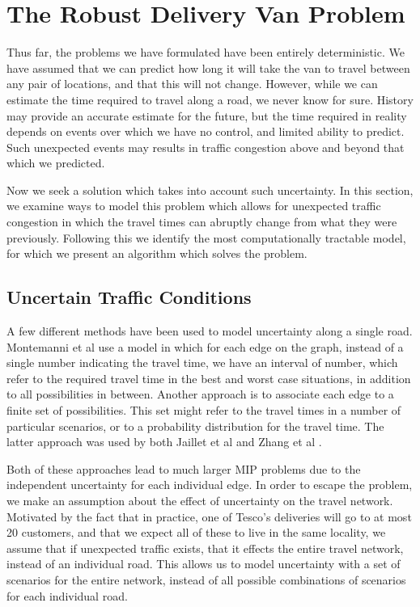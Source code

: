 \section{The Robust Delivery Van Problem}
\label{sec:robust}
Thus far, the problems we have formulated have been entirely deterministic. We have assumed that we can predict how long it will take the van to travel between any pair of locations, and that this will not change. However, while we can estimate the time required to travel along a road, we never know for sure. History may provide an accurate estimate for the future, but the time required in reality depends on events over which we have no control, and limited ability to predict. Such unexpected events may results in traffic congestion above and beyond that which we predicted. 

Now we seek a solution which takes into account such uncertainty. In this section, we examine ways to model this problem which allows for unexpected traffic congestion in which the travel times can abruptly change from what they were previously. Following this we identify the most computationally tractable model, for which we present an algorithm which solves the problem.   


\subsection{Uncertain Traffic Conditions}
A few different methods have been used to model uncertainty along a single road. Montemanni et al \cite{montemanni2007robust} use a model in which for each edge on the graph, instead of a single number indicating the travel time, we have an interval of number, which refer to the required travel time in the best and worst case situations, in addition to all possibilities in between. Another approach is to associate each edge to a finite set of possibilities. This set might refer to the travel times in a number of particular scenarios, or to a probability distribution for the travel time. The latter approach was used by both Jaillet et al \cite{jaillet2016routing} and Zhang et al \cite{zhangrouting}.

Both of these approaches lead to much larger MIP problems due to the independent uncertainty for each individual edge. In order to escape the problem, we make an assumption about the effect of uncertainty on the travel network. Motivated by the fact that in practice, one of Tesco's deliveries will go to at most 20 customers, and that we expect all of these to live in the same locality, we assume that if unexpected traffic exists, that it effects the entire travel network, instead of an individual road. This allows us to model uncertainty with a set of scenarios for the entire network, instead of all possible combinations of scenarios for each individual road.

